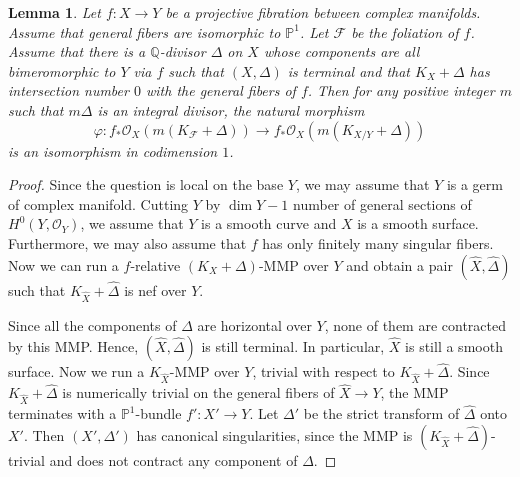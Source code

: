 \documentclass[12pt]{amsart}
\newcommand{\<}{\leq}
\def\subset{\subseteq}
\newcommand{\D}{\Delta}
\def\mcO{\mathcal{O}}
\def\mcF{\mathcal{F}}
\newtheorem{lemma}[theorem]{Lemma}
\theoremstyle{remark}
\theoremstyle{definition}
\theoremstyle{definition}
\numberwithin{equation}{section}
\theoremstyle{definition}
\theoremstyle{definition}
\def\dim{\operatorname{dim}}
\begin{document}
\begin{lemma}
\label{lem-same-direct-image-horizontal-bimeromorphic}
Let $f\colon X\to Y$ be a projective fibration between  complex manifolds. Assume that general fibers are isomorphic to $\mathbb{P}^1$.  
Let $\mcF$ be the foliation of $f$. 
Assume  that there is a  $\mathbb{Q}$-divisor  $\D $ on $X$ whose components are all bimeromorphic to $Y$ \textit{via} $f$ such that  $(X,\D)$ is terminal and that $K_X+\D$ has intersection number $0$ with the general fibers of $f$.  Then for any positive integer $m$ such that $m\D$ is an integral divisor, the natural morphism  $$\varphi\colon f_*\mathcal{O}_{X}(m(K_{\mcF}+ \D)) \to  f_*\mathcal{O}_{X}(m(K_{X/Y}+ \D))$$ is an isomorphism in codimension $1$.
\end{lemma}

\begin{proof} 
Since the question is local on the base $Y$, we may assume that $Y$ is a germ of complex manifold. 
Cutting $Y$ by $\dim Y-1$ number of general sections of $H^0(Y, \mcO_Y)$, 
we assume that $Y$ is a smooth curve and $X$ is a smooth  surface. 
Furthermore, we may also assume that $f$ has only finitely many singular fibers. 
Now   we can run a $f$-relative $(K_X+\D)$-MMP over $Y$  and obtain a pair $(\widehat{X},\widehat{\D})$ such that $K_{\widehat{X}}+\widehat{\D}$ is nef over $Y$.  

Since all  the  components of $\D$ are horizontal over $Y$, none of them are contracted by this MMP. 
Hence, $(\widehat{X},\widehat{\D})$ is still terminal. In particular, $\widehat{X}$ is still a smooth surface. 
Now we run a $K_{\widehat{X}}$-MMP over $Y$, trivial with respect to  $K_{\widehat{X}}+\widehat{\D}$. 
Since  $K_{\widehat{X}}+\widehat{\D}$ is numerically trivial on the general fibers of $\widehat{X} \to Y$, the MMP terminates with a $\mathbb{P}^1$-bundle $f'\colon X'\to Y$. 
Let $\D'$ be the strict  transform of $\widehat{\D}$ onto $X'$. 
Then  $(X',\D')$ has canonical singularities,  since the MMP is $(K_{\widehat{X}}+\widehat{\D})$-trivial and does not contract any component of $\widehat{\D}$. 


\end{proof}
\end{document}
